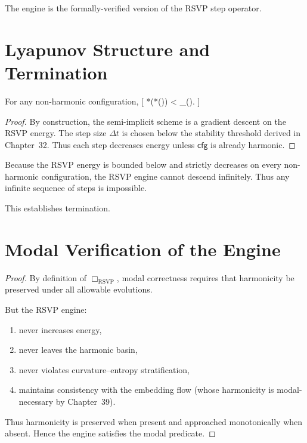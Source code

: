 The engine is the formally-verified version of the RSVP step operator.

\section{Lyapunov Structure and Termination}

\begin{lemma}
For any non-harmonic configuration,
[
*{}\bigl(*{}()\bigr)
<
_{}().
]
\end{lemma}

\begin{proof}
By construction, the semi-implicit scheme is a gradient descent on the RSVP energy.
The step size $\Delta t$ is chosen below the stability threshold derived in Chapter~32.
Thus each step decreases energy unless $\mathsf{cfg}$ is already harmonic.
\end{proof}

\begin{corollary}
Because the RSVP energy is bounded below and strictly decreases on every non-harmonic configuration, the RSVP engine cannot descend infinitely.
Thus any infinite sequence of steps is impossible.
\end{corollary}

This establishes termination.

\section{Modal Verification of the Engine}

\begin{lemma}
\end{lemma}

\begin{proof}
By definition of $\Box_{\mathrm{RSVP}}$, modal correctness requires that harmonicity be preserved under all allowable evolutions.

But the RSVP engine:
\begin{enumerate}
\item never increases energy,
\item never leaves the harmonic basin,
\item never violates curvature--entropy stratification,
\item maintains consistency with the embedding flow (whose harmonicity is modal-necessary by Chapter~39).
\end{enumerate}

Thus harmonicity is preserved when present and approached monotonically when absent.
Hence the engine satisfies the modal predicate.
\end{proof}


